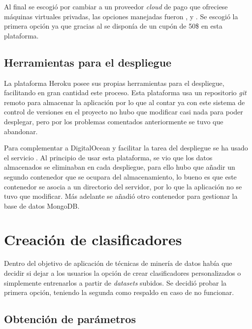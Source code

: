 Al final se escogió por cambiar a un proveedor \textit{cloud} de pago que
ofreciese máquinas virtuales privadas, las opciones manejadas fueron
,
 y
. Se escogió la primera
opción ya que gracias al
 se
disponía de un cupón de 50\$ en esta plataforma.

\subsection{Herramientas para el despliegue}

La plataforma Heroku posee sus propias herramientas para el despliegue,
facilitando en gran cantidad este proceso. Esta plataforma usa un repositorio
\textit{git} remoto para almacenar la aplicación por lo que al contar ya con
este sistema de control de versiones en el proyecto no hubo que modificar casi
nada para poder desplegar, pero por los problemas comentados anteriormente se
tuvo que abandonar.

Para complementar a DigitalOcean y facilitar la tarea del despliegue se ha usado
el servicio . Al principio de usar
esta plataforma, se vio que los datos almacenados se eliminaban en cada
despliegue, para ello hubo que añadir un segundo contenedor que se ocupara del
almacenamiento, lo bueno es que este contenedor se asocia a un directorio del
servidor, por lo que la aplicación no se tuvo que modificar. Más adelante se
añadió otro contenedor para gestionar la base de datos MongoDB.

\section{Creación de clasificadores}

Dentro del objetivo de aplicación de técnicas de minería de datos había que
decidir si dejar a los usuarios la opción de crear clasificadores personalizados
o simplemente entrenarlos a partir de \textit{datasets} subidos. Se decidió
probar la primera opción, teniendo la segunda como respaldo en caso de no
funcionar.

\subsection{Obtención de parámetros}

